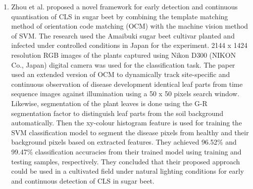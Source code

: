 \begin{enumerate}
\item Zhou et al. \cite{zhou2013early} proposed a novel framework for early detection and continuous quantisation of CLS in sugar beet by combining the template matching method of orientation code matching (OCM) with the machine vision method of SVM. The research used the Amaibuki sugar beet cultivar planted and infected under controlled conditions in Japan for the experiment. 2144 x 1424 resolution RGB images of the plants captured using Nikon D300 (NIKON Co., Japan) digital camera was used for the classification task. 
The paper used an extended version of OCM to dynamically track site-specific and continuous observation of disease development identical leaf parts from time sequence images against illumination using a 50 x 50 pixels search window. Likewise, segmentation of the plant leaves is done using the G-R segmentation factor to distinguish leaf parts from the soil background automatically. Then the xy-colour histogram feature is used for training the SVM classification model to segment the disease pixels from healthy and their background pixels based on extracted features. They achieved 96.52\% and 99.47\% classification accuracies from their trained model using training and testing samples, respectively. They concluded that their proposed approach could be used in a cultivated field under natural lighting conditions for early and continuous detection of CLS in sugar beet.


\end{enumerate}
